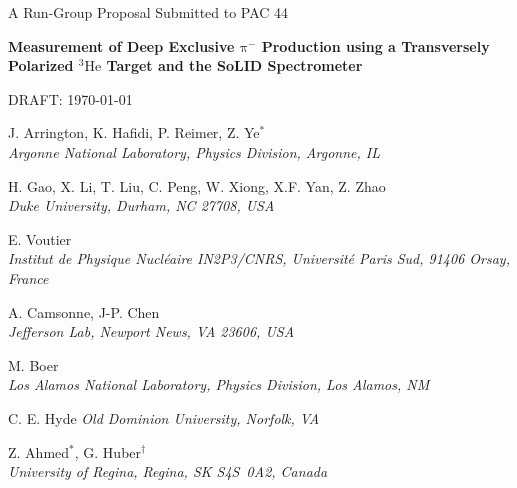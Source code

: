 \documentclass{article}
\begin{document}

\begin{center}

{\Huge A Run-Group Proposal Submitted to PAC 44}

\vspace*{25pt}

{\LARGE\bf
Measurement of Deep Exclusive $\mathrm\pi^-$ Production
using a Transversely Polarized $\mathrm{^{3}He}$ Target
and the SoLID Spectrometer}

\vspace*{2ex}
DRAFT: \today

\vspace*{30pt}

J. Arrington, K. Hafidi, P. Reimer, Z. Ye$^\ast$ \\
\vspace*{5pt}
{\it Argonne National Laboratory, Physics Division, Argonne, IL}
\vspace*{15pt}

H. Gao, X. Li, T. Liu, C. Peng, W. Xiong, X.F. Yan, Z. Zhao\\
\vspace*{5pt}
{\it Duke University, Durham, NC 27708, USA}
\vspace*{15pt}

E. Voutier\\
\vspace*{5pt}
{\it Institut de Physique Nucl\'eaire IN2P3/CNRS, Universit\'e Paris Sud, 
91406 Orsay, France}
\vspace*{15pt}

A. Camsonne,  J-P. Chen\\
\vspace*{5pt}
{\it  Jefferson Lab, Newport News, VA 23606, USA}
\vspace*{15pt}

M. Boer\\
\vspace*{5pt}
{\it Los Alamos National Laboratory, Physics Division, Los Alamos, NM}
\vspace*{15pt}

C. E. Hyde
\vspace*{5pt}
{\it Old Dominion University, Norfolk, VA}
\vspace*{15pt}

Z. Ahmed$^\ast$, G. Huber$^\dagger$  \\
\vspace*{5pt}
{\it University of Regina, Regina, SK S4S~0A2, Canada}
\vspace*{20pt}

\end{center}
\end{document}
